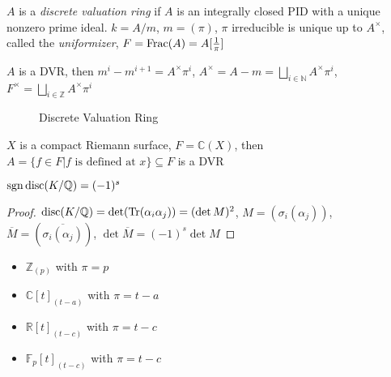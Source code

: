 \documentclass[../main.tex]{subfiles}
\begin{document}
\begin{definition}
$A$ is a \textit{discrete valuation ring} if $A$ is an integrally closed PID with a unique nonzero prime ideal. $k=A/m$, $m=(\pi)$, $\pi$ irreducible is unique up to $A^\times$, called the \textit{uniformizer}, $F=\operatorname{Frac}(A)=A[\frac{1}{\pi}]$
\end{definition}

\begin{proposition}
$A$ is a DVR, then $m^i-m^{i+1}=A^\times\pi^i$, $A^\times=A-m=\bigsqcup_{i\in\mathbb N}A^\times\pi^i$, $F^\times=\bigsqcup_{i\in\mathbb Z}A^\times\pi^i$
\begin{figure}[h!]
\centering
{}
\caption{Discrete Valuation Ring}\label{DVR}
\end{figure}
\end{proposition}

\begin{proposition}
$X$ is a compact Riemann surface, $F=\mathbb C(X)$, then $A=\{f\in F|f\text{ is defined at }x\}\subseteq F$ is a DVR
\end{proposition}

\begin{theorem}
$\operatorname{sgn}\operatorname{disc}(K/\mathbb Q)=(-1)^s$
\end{theorem}

\begin{proof}
$\operatorname{disc}(K/\mathbb Q)=\det(\operatorname{Tr}(\alpha_i\alpha_j))=(\det M)^2$, $M=(\sigma_i(\alpha_j))$, $\overline M=(\overline{\sigma_i(\alpha_j)})$, $\det\overline M=(-1)^s\det M$
\end{proof}

\begin{example}
\begin{itemize}
\item $\mathbb Z_{(p)}$ with $\pi=p$
\item $\mathbb C[t]_{(t-a)}$ with $\pi=t-a$
\item $\mathbb R[t]_{(t-c)}$ with $\pi=t-c$
\item $\mathbb F_p[t]_{(t-c)}$ with $\pi=t-c$
\end{itemize}
\end{example}
\end{document}
